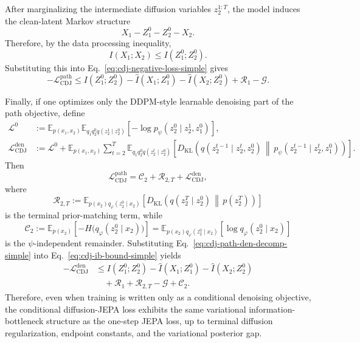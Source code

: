 \documentclass{article}
\newcommand{\E}{\mathbb{E}}
\newcommand{\KL}{D_{\mathrm{KL}}}
\begin{document}
After marginalizing the intermediate diffusion variables $z_2^{1:T}$, the model
induces the clean-latent Markov structure
\[
X_1 - Z_1^0 - Z_2^0 - X_2.
\]
Therefore, by the data processing inequality,
\begin{equation}
I(X_1;X_2)
\le
I(Z_1^0;Z_2^0).
\label{eq:cdj-dpi-simple}
\end{equation}
Substituting this into Eq.~\eqref{eq:cdj-negative-loss-simple} gives
\begin{equation}
-\mathcal L_{\mathrm{CDJ}}^{\mathrm{path}}
\le
I(Z_1^0;Z_2^0)
-
\widehat I(X_1;Z_1^0)
-
\widehat I(X_2;Z_2^0)
+
\mathcal R_1
-
\mathcal G.
\label{eq:cdj-ib-bound-simple}
\end{equation}

Finally, if one optimizes only the DDPM-style learnable denoising part of the
path objective, define
\begin{align}
\mathcal L^0
&:=
\E_{p(x_1,x_2)}
\E_{q_1 q_2^0 q(z_2^1\mid z_2^0)}
\left[
-\log p_\psi(z_2^0\mid z_2^1,z_1^0)
\right],
\nonumber \\
\mathcal L_{\mathrm{CDJ}}^{\mathrm{den}}
&:=
\mathcal L^0
+
\E_{p(x_1,x_2)}
\sum_{t=2}^{T}
\E_{q_1 q_2^0 q(z_2^t\mid z_2^0)}
\left[
\KL
\left(
q(z_2^{t-1}\mid z_2^t,z_2^0)
\,\middle\|\,
p_\psi(z_2^{t-1}\mid z_2^t,z_1^0)
\right)
\right]
.
\label{eq:cdj-denoising-loss-simple}
\end{align}
Then
\begin{equation}
\mathcal L_{\mathrm{CDJ}}^{\mathrm{path}}
=
\mathcal C_2
+
\mathcal R_{2,T}
+
\mathcal L_{\mathrm{CDJ}}^{\mathrm{den}},
\label{eq:cdj-path-den-decomp-simple}
\end{equation}
where
\begin{equation}
\mathcal R_{2,T}
:=
\E_{p(x_2)q_\varphi(z_2^0\mid x_2)}
\left[
\KL
\left(
q(z_2^T\mid z_2^0)
\,\middle\|\,
p(z_2^T)
\right)
\right]
\label{eq:cdj-terminal-regularizer-simple}
\end{equation}
is the terminal prior-matching term, while
\begin{equation}
\mathcal C_2
:=
\E_{p(x_2)}
\left[
-H\bigl(q_\varphi(z_2^0\mid x_2)\bigr)
\right]
=
\E_{p(x_2)q_\varphi(z_2^0\mid x_2)}
\left[
\log q_\varphi(z_2^0\mid x_2)
\right]
\label{eq:cdj-c2-simple}
\end{equation}
is the $\psi$-independent remainder. Substituting
Eq.~\eqref{eq:cdj-path-den-decomp-simple} into
Eq.~\eqref{eq:cdj-ib-bound-simple} yields
\begin{align}
-\mathcal L_{\mathrm{CDJ}}^{\mathrm{den}}
&\le
I(Z_1^0;Z_2^0)
-
\widehat I(X_1;Z_1^0)
-
\widehat I(X_2;Z_2^0)
\nonumber \\
&\quad
+
\mathcal R_1
+
\mathcal R_{2,T}
-
\mathcal G
+
\mathcal C_2.
\label{eq:cdj-denoising-only-ib-bound-simple}
\end{align}
Therefore, even when training is written only as a conditional denoising
objective, the conditional diffusion-JEPA loss exhibits the same variational
information-bottleneck structure as the one-step JEPA loss, up to terminal
diffusion regularization, endpoint constants, and the variational posterior
gap.
\end{document}
